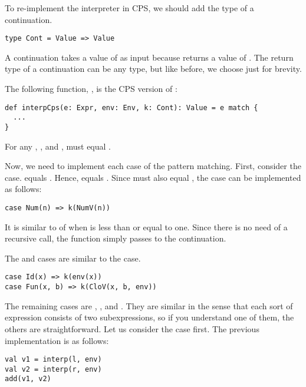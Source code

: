 To re-implement the interpreter in CPS, we should add the type of a
continuation.

\begin{verbatim}
type Cont = Value => Value
\end{verbatim}

A continuation takes a value of  as input because 
returns a value of . The return type of a continuation can be any
type, but like before, we choose  just for brevity.

The following function, , is the CPS version of :

\begin{verbatim}
def interpCps(e: Expr, env: Env, k: Cont): Value = e match {
  ...
}
\end{verbatim}

For any , , and ,  must equal
.

Now, we need to implement each case of the pattern matching. First, consider the
 case.  equals . Hence,
 equals . Since
 must also equal , the
 case can be implemented as follows:

\begin{verbatim}
case Num(n) => k(NumV(n))
\end{verbatim}

It is similar to  of  when  is less than
or equal to one. Since there is no need of a recursive call, the function simply
passes  to the continuation.

The  and  cases are similar to the  case.

\begin{verbatim}
case Id(x) => k(env(x))
case Fun(x, b) => k(CloV(x, b, env))
\end{verbatim}

The remaining cases are , , and . They are similar
in the sense that each sort of expression consists of two subexpressions, so if you
understand one of them, the others are straightforward. Let us consider the  case
first. The previous implementation is as follows:

\begin{verbatim}
val v1 = interp(l, env)
val v2 = interp(r, env)
add(v1, v2)
\end{verbatim}

